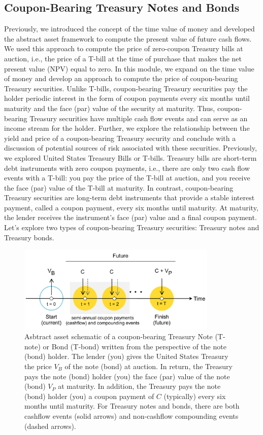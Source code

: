 \documentclass[11pt]{article}
\theoremstyle{definition}
\begin{document}
\subsection{Coupon-Bearing Treasury Notes and Bonds}
Previously, we introduced the concept of the time value of money and developed the abstract asset framework to compute the present value of future cash flows.
We used this approach to compute the price of zero-coupon Treasury bills at auction, 
i.e., the price of a T-bill at the time of purchase that makes the net present value (NPV) equal to zero.
In this module, we expand on the time value of money and develop an approach to compute the price of coupon-bearing Treasury securities.
Unlike T-bills, coupon-bearing Treasury securities pay the holder periodic interest in the form of coupon payments every six months until maturity and the face (par) value of the security at maturity.
Thus, coupon-bearing Treasury securities have multiple cash flow events and can serve as an income stream for the holder.
Further, we explore the relationship between the yield and price of a coupon-bearing Treasury security and conclude with a discussion of potential sources of 
risk associated with these securities. Previously, we explored United States Treasury Bills or T-bills. Treasury bills are short-term debt instruments with zero coupon payments, 
i.e., there are only two cash flow events with a T-bill: you pay the price of the T-bill at auction, and you receive the face (par) value of the T-bill at maturity. 
In contrast, coupon-bearing Treasury securities are long-term debt instruments that provide a stable interest payment, called a coupon payment, every six months until maturity.
At maturity, the lender receives the instrument's face (par) value and a final coupon payment.
Let's explore two types of coupon-bearing Treasury securities: Treasury notes and Treasury bonds.
\begin{figure}[h]
    \centering
    \includegraphics[width=0.85\textwidth]{./figs/Fig-Bond-Asset-Timeline-Schematic.pdf}
    \caption{Asbtract asset schematic of a coupon-bearing Treasury Note (T-note) or Bond (T-bond) written from the perspective of the note (bond) holder.
	The lender (you) gives the United States Treasury 
    the price $V_{B}$ of the note (bond) at auction. In return, the Treasury pays the note (bond) holder (you) the face (par) value of the note (bond) $V_{P}$ at maturity. 
	In addition, the Treasury pays the note (bond) holder (you) a coupon payment of $C$ (typically) every six months until maturity.
	For Treasury notes and bonds, there are both cashflow events (solid arrows) and non-cashflow compounding events (dashed arrows).}\label{fig:govt-note-bond-schematic}
\end{figure}
\end{document}
